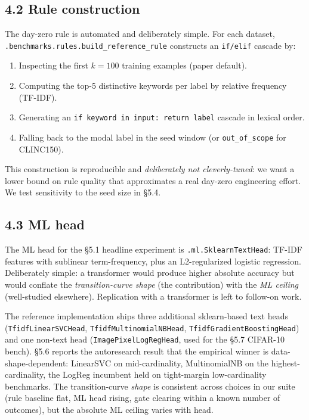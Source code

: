 \subsection{4.2 Rule construction}\label{rule-construction}

The day-zero rule is automated and deliberately simple. For each
dataset, \texttt{\pkgname{}.benchmarks.rules.build\_reference\_rule}
constructs an \texttt{if/elif} cascade by:

\begin{enumerate}
\def\labelenumi{\arabic{enumi}.}
\tightlist
\item
  Inspecting the first \(k = 100\) training examples (paper default).
\item
  Computing the top-5 distinctive keywords per label by relative
  frequency (TF-IDF).
\item
  Generating an \texttt{if\ keyword\ in\ input:\ return\ label} cascade
  in lexical order.
\item
  Falling back to the modal label in the seed window (or
  \texttt{out\_of\_scope} for CLINC150).
\end{enumerate}

This construction is reproducible and \emph{deliberately not
cleverly-tuned}: we want a lower bound on rule quality that approximates
a real day-zero engineering effort. We test sensitivity to the seed size
in §5.4.

\subsection{4.3 ML head}\label{ml-head}

The ML head for the §5.1 headline experiment is
\texttt{\pkgname{}.ml.SklearnTextHead}: TF-IDF features with sublinear
term-frequency, plus an L2-regularized logistic regression. Deliberately
simple: a transformer would produce higher absolute accuracy but would
conflate the \emph{transition-curve shape} (the contribution) with the
\emph{ML ceiling} (well-studied elsewhere). Replication with a
transformer is left to follow-on work.

The reference implementation ships three additional sklearn-based text
heads (\texttt{TfidfLinearSVCHead}, \texttt{TfidfMultinomialNBHead},
\texttt{TfidfGradientBoostingHead}) and one non-text head
(\texttt{ImagePixelLogRegHead}, used for the §5.7 CIFAR-10 bench). §5.6
reports the autoresearch result that the empirical winner is
data-shape-dependent: LinearSVC on mid-cardinality, MultinomialNB on the
highest-cardinality, the LogReg incumbent held on tight-margin
low-cardinality benchmarks. The transition-curve \emph{shape} is
consistent across choices in our suite (rule baseline flat, ML head
rising, gate clearing within a known number of outcomes), but the
absolute ML ceiling varies with head.

